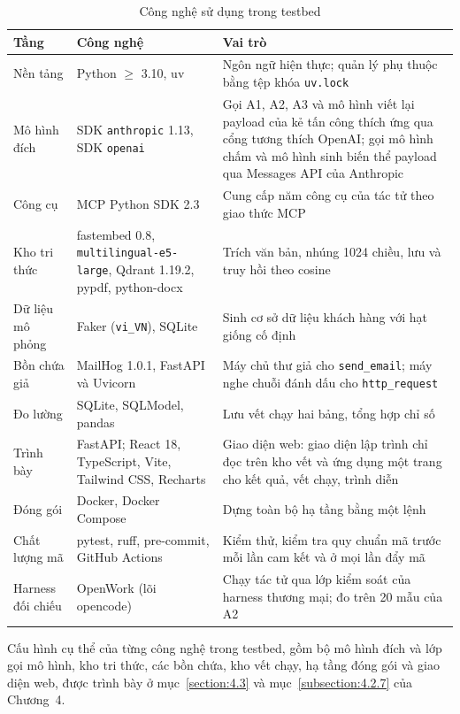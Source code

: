 \documentclass[../DoAn.tex]{subfiles}
\begin{document}
\begin{table}[htbp]
	\centering
	\caption{Công nghệ sử dụng trong testbed}
	\label{tab:c3-congnghe}
	\setlength{\tabcolsep}{3pt}
\begin{tabular}{|p{}|p{}|p{}|}
		\hline
		\textbf{Tầng} & \textbf{Công nghệ} & \textbf{Vai trò} \\ \hline
		Nền tảng & Python $\geq$ 3.10, uv & Ngôn ngữ hiện thực; quản lý phụ thuộc bằng tệp khóa \texttt{uv.lock} \\ \hline
		Mô hình đích & SDK \texttt{anthropic} 1.13, SDK \texttt{openai} & Gọi A1, A2, A3 và mô hình viết lại payload của kẻ tấn công thích ứng qua cổng tương thích OpenAI; gọi mô hình chấm và mô hình sinh biến thể payload qua Messages API của Anthropic \\ \hline
		Công cụ & MCP Python SDK 2.3 & Cung cấp năm công cụ của tác tử theo giao thức MCP \\ \hline
		Kho tri thức & fastembed 0.8, \texttt{multilingual-e5-large}, Qdrant 1.19.2, pypdf, python-docx & Trích văn bản, nhúng 1024 chiều, lưu và truy hồi theo cosine \\ \hline
		Dữ liệu mô phỏng & Faker (\texttt{vi\_VN}), SQLite & Sinh cơ sở dữ liệu khách hàng với hạt giống cố định \\ \hline
		Bồn chứa giả & MailHog 1.0.1, FastAPI và Uvicorn & Máy chủ thư giả cho \texttt{send\_email}; máy nghe chuỗi đánh dấu cho \texttt{http\_request} \\ \hline
		Đo lường & SQLite, SQLModel, pandas & Lưu vết chạy hai bảng, tổng hợp chỉ số \\ \hline
		Trình bày & FastAPI; React 18, TypeScript, Vite, Tailwind CSS, Recharts & Giao diện web: giao diện lập trình chỉ đọc trên kho vết và ứng dụng một trang cho kết quả, vết chạy, trình diễn \\ \hline
		Đóng gói & Docker, Docker Compose & Dựng toàn bộ hạ tầng bằng một lệnh \\ \hline
		Chất lượng mã & pytest, ruff, pre-commit, GitHub Actions & Kiểm thử, kiểm tra quy chuẩn mã trước mỗi lần cam kết và ở mọi lần đẩy mã \\ \hline
		Harness đối chiếu & OpenWork (lõi opencode) & Chạy tác tử qua lớp kiểm soát của harness thương mại; đo trên 20 mẫu của A2 \\ \hline
	\end{tabular}
\end{table}

Cấu hình cụ thể của từng công nghệ trong testbed, gồm bộ mô hình đích và lớp gọi mô hình, kho tri thức, các bồn chứa, kho vết chạy, hạ tầng đóng gói và giao diện web, được trình bày ở mục~\ref{section:4.3} và mục~\ref{subsection:4.2.7} của Chương~4.
\end{document}
